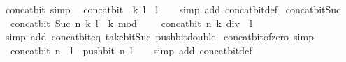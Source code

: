 \begin{isabellebody}
\endisatagproof
{\isafoldproof}%
%
\isadelimproof
\isanewline
%
\endisadelimproof
\isanewline
{}\isamarkupfalse%
\ concat{\isacharunderscore}{\kern0pt}bit{\isacharunderscore}{\kern0pt}{}\ {\isacharbrackleft}{\kern0pt}simp{\isacharbrackright}{\kern0pt}{\isacharcolon}{\kern0pt}\isanewline
\ \ {\isacartoucheopen}concat{\isacharunderscore}{\kern0pt}bit\ {}\ k\ l\ {\isacharequal}{\kern0pt}\ l{\isacartoucheclose}\isanewline
%
\isadelimproof
\ \ %
\endisadelimproof
%
\isatagproof
{}\isamarkupfalse%
\ {\isacharparenleft}{\kern0pt}simp\ add{\isacharcolon}{\kern0pt}\ concat{\isacharunderscore}{\kern0pt}bit{\isacharunderscore}{\kern0pt}def{\isacharparenright}{\kern0pt}%
\endisatagproof
{\isafoldproof}%
%
\isadelimproof
\isanewline
%
\endisadelimproof
\isanewline
{}\isamarkupfalse%
\ concat{\isacharunderscore}{\kern0pt}bit{\isacharunderscore}{\kern0pt}Suc{\isacharcolon}{\kern0pt}\isanewline
\ \ {\isacartoucheopen}concat{\isacharunderscore}{\kern0pt}bit\ {\isacharparenleft}{\kern0pt}Suc\ n{\isacharparenright}{\kern0pt}\ k\ l\ {\isacharequal}{\kern0pt}\ k\ mod\ {}\ {\isacharplus}{\kern0pt}\ {}\ {\isacharasterisk}{\kern0pt}\ concat{\isacharunderscore}{\kern0pt}bit\ n\ {\isacharparenleft}{\kern0pt}k\ div\ {}{\isacharparenright}{\kern0pt}\ l{\isacartoucheclose}\isanewline
%
\isadelimproof
\ \ %
\endisadelimproof
%
\isatagproof
{}\isamarkupfalse%
\ {\isacharparenleft}{\kern0pt}simp\ add{\isacharcolon}{\kern0pt}\ concat{\isacharunderscore}{\kern0pt}bit{\isacharunderscore}{\kern0pt}eq\ take{\isacharunderscore}{\kern0pt}bit{\isacharunderscore}{\kern0pt}Suc\ push{\isacharunderscore}{\kern0pt}bit{\isacharunderscore}{\kern0pt}double{\isacharparenright}{\kern0pt}%
\endisatagproof
{\isafoldproof}%
%
\isadelimproof
\isanewline
%
\endisadelimproof
\isanewline
{}\isamarkupfalse%
\ concat{\isacharunderscore}{\kern0pt}bit{\isacharunderscore}{\kern0pt}of{\isacharunderscore}{\kern0pt}zero{\isacharunderscore}{\kern0pt}{}\ {\isacharbrackleft}{\kern0pt}simp{\isacharbrackright}{\kern0pt}{\isacharcolon}{\kern0pt}\isanewline
\ \ {\isacartoucheopen}concat{\isacharunderscore}{\kern0pt}bit\ n\ {}\ l\ {\isacharequal}{\kern0pt}\ push{\isacharunderscore}{\kern0pt}bit\ n\ l{\isacartoucheclose}\isanewline
%
\isadelimproof
\ \ %
\endisadelimproof
%
\isatagproof
{}\isamarkupfalse%
\ {\isacharparenleft}{\kern0pt}simp\ add{\isacharcolon}{\kern0pt}\ concat{\isacharunderscore}{\kern0pt}bit{\isacharunderscore}{\kern0pt}def{\isacharparenright}{\kern0pt}%

\end{isabellebody}
